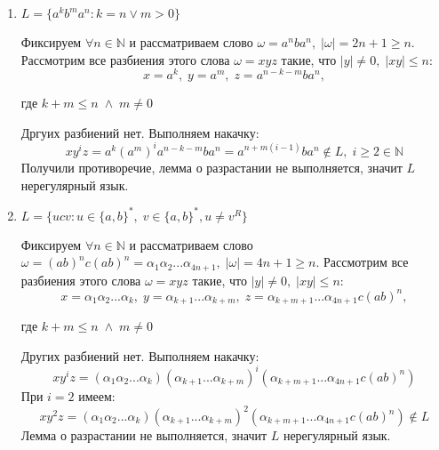 \documentclass{article}
\begin{document}
\begin{enumerate}
    \item \(L = \{a^{k}b^{m}a^{n} : k = n \vee m > 0\}\)
    
    
   Фиксируем \(\forall n \in \mathbb{N} \) и рассматриваем слово \(\omega = a^nba^n, \; |\omega| = 2n + 1 \geqslant n\). Рассмотрим все разбиения этого слова \(\omega = xyz\) такие, что \(|y| \neq 0, \; |xy| \leq n\):
    $$x = a^{k}, \; y = a^{m}, \; z = a^{n-k-m}ba^{n},$$ 
    
    \begin{center}
        где \(k + m \leqslant n \; \wedge \; m \ne 0\)
    \end{center} 
    
    Дргуих разбиений нет.
    Выполняем накачку: 
    $$xy^{i}z = a^{k}(a^{m})^{i}a^{n-k-m}ba^{n} = a^{n+m(i-1)}ba^{n} \notin L, \; i 
    \geqslant 2 \in \mathbb{N} $$
    Получили противоречие, лемма о разрастании не выполняется, значит \(L\) нерегулярный язык.
    
    \item \(L = \{ucv : u \in \{a, b\}^*, \; v \in \{a, b\}^*, u \ne v^R \}\)
    
    
    Фиксируем \(\forall n \in \mathbb{N} \) и рассматриваем слово \(\omega = (ab)^nc(ab)^n = \alpha_1\alpha_2...\alpha_{4n+1}, \; |\omega| = 4n + 1 \geqslant n\). Рассмотрим все разбиения этого слова \(\omega = xyz\) такие, что \(|y| \neq 0, \; |xy| \leq n\):
    $$x = \alpha_1\alpha_2...\alpha_k, \; y = \alpha_{k+1}...\alpha_{k+m}, \; z = \alpha_{k+m+1}...\alpha_{4n+1}c(ab)^n,$$
    
    \begin{center}
        где \(k + m \leqslant n \; \wedge \; m \ne 0\)
    \end{center} 
    
    Других разбиений нет. Выполняем накачку: 
    $$xy^{i}z = (\alpha_1\alpha_2...\alpha_k)(\alpha_{k+1}...\alpha_{k+m})^i(\alpha_{k+m+1}...\alpha_{4n+1}c(ab)^n)$$
    При \(i = 2\) имеем:
    $$xy^{2}z = (\alpha_1\alpha_2...\alpha_k)(\alpha_{k+1}...\alpha_{k+m})^2(\alpha_{k+m+1}...\alpha_{4n+1}c(ab)^n) \notin L$$
    Лемма о разрастании не выполняется, значит \(L\) нерегулярный язык.

\end{enumerate}
\end{document}

